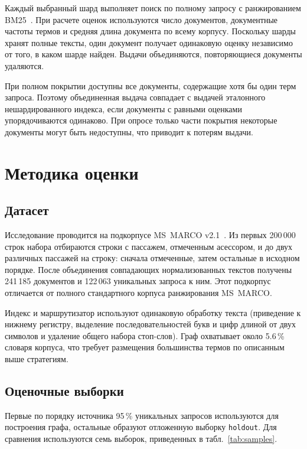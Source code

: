 \documentclass[10pt, a4paper, twoside]{article}
\newcommand{\strategy}[1]{\texttt{#1}}
\begin{document}
\begin{ntvbody}
Каждый выбранный шард выполняет поиск по полному запросу с ранжированием BM25~\cite{robertson2009}.
При расчете оценок используются число документов, документные частоты термов и средняя длина документа по всему корпусу.
Поскольку шарды хранят полные тексты, один документ получает одинаковую оценку независимо от того, в каком шарде найден.
Выдачи объединяются, повторяющиеся документы удаляются.

При полном покрытии доступны все документы, содержащие хотя бы один терм запроса.
Поэтому объединенная выдача совпадает с выдачей эталонного нешардированного индекса, если документы с равными оценками упорядочиваются одинаково.
При опросе только части покрытия некоторые документы могут быть недоступны, что приводит к потерям выдачи.

\section{Методика оценки}

\subsection{Датасет}
Исследование проводится на подкорпусе MS~MARCO v2.1~\cite{bajaj2016}.
Из первых 200\,000 строк набора отбираются строки с пассажем, отмеченным асессором, и до двух различных пассажей на строку: сначала отмеченные, затем остальные в исходном порядке.
После объединения совпадающих нормализованных текстов получены 241\,185 документов и 122\,063 уникальных запроса к ним.
Этот подкорпус отличается от полного стандартного корпуса ранжирования MS~MARCO.

Индекс и маршрутизатор используют одинаковую обработку текста (приведение к нижнему регистру, выделение последовательностей букв и цифр длиной от двух символов и удаление общего набора стоп-слов).
Граф охватывает около 5.6\,\% словаря корпуса, что требует размещения большинства термов по описанным выше стратегиям.

\subsection{Оценочные выборки}
Первые по порядку источника 95\,\% уникальных запросов используются для построения графа, остальные образуют отложенную выборку \strategy{holdout}.
Для сравнения используются семь выборок, приведенных в табл.~\ref{tab:samples}.

\end{ntvbody}
\end{document}
